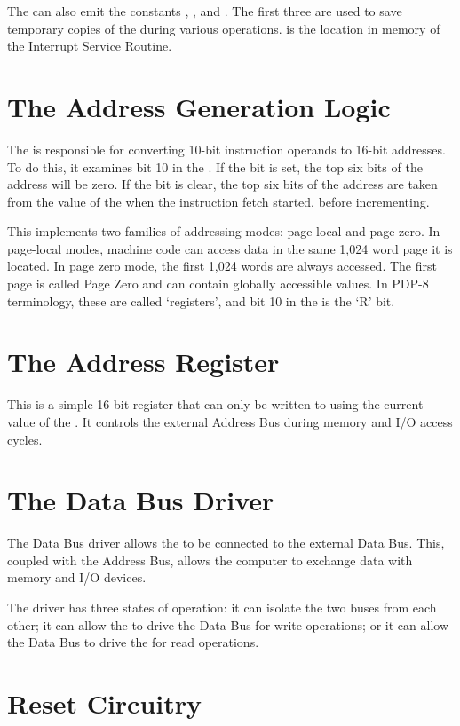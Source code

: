 The \ALU{} can also emit the constants , ,
 and . The first three are used to save temporary
copies of the \PC{} during various operations.  is the
location in memory of the Interrupt Service Routine.

\section{The Address Generation Logic}

The \AGL{} is responsible for converting 10-bit instruction operands
to 16-bit addresses. To do this, it examines bit 10 in the \IR. If the
bit is set, the top six bits of the address will be zero. If the bit
is clear, the top six bits of the address are taken from the value of
the \PC{} when the instruction fetch started, before incrementing.

This implements two families of addressing modes: page-local and page
zero. In page-local modes, machine code can access data in the same
1,024 word page it is located. In page zero mode, the first 1,024
words are always accessed. The first page is called Page Zero and can
contain globally accessible values. In PDP-8 terminology, these are
called ‘registers’, and bit 10 in the \IR{} is the ‘R’ bit.

\section{The Address Register}

This is a simple 16-bit register that can only be written to using the
current value of the \IBUS. It controls the external Address Bus
during memory and I/O access cycles.

\section{The Data Bus Driver}

The Data Bus driver allows the \IBUS{} to be connected to the external
Data Bus. This, coupled with the Address Bus, allows the computer to
exchange data with memory and I/O devices.

The driver has three states of operation: it can isolate the two buses
from each other; it can allow the \IBUS{} to drive the Data Bus for
write operations; or it can allow the Data Bus to drive the \IBUS{}
for read operations.

\section{Reset Circuitry}

